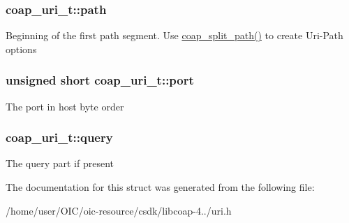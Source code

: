 \subsubsection[{path}]{ coap\+\_\+uri\+\_\+t\+::path}\label{structcoap__uri__t_ac6a10f366eb52282158abd163b2443b9}
Beginning of the first path segment. Use \hyperlink{group__uri__parse_gaf908e5dec2807e2591c9d4b7a2e1bdc9}{coap\+\_\+split\+\_\+path()} to create Uri-\/\+Path options \hypertarget{structcoap__uri__t_a032197612d4eea039f5bf690b074998c}{}
\subsubsection[{port}]{\setlength{\rightskip}{0pt plus 5cm}unsigned short coap\+\_\+uri\+\_\+t\+::port}\label{structcoap__uri__t_a032197612d4eea039f5bf690b074998c}
The port in host byte order \hypertarget{structcoap__uri__t_ac0650ecfdcd7e5f7ba8142fbffba6068}{}
\subsubsection[{query}]{ coap\+\_\+uri\+\_\+t\+::query}\label{structcoap__uri__t_ac0650ecfdcd7e5f7ba8142fbffba6068}
The query part if present 

The documentation for this struct was generated from the following file\+:\begin{DoxyCompactItemize}
\item 
/home/user/\+O\+I\+C/oic-\/resource/csdk/libcoap-\/4../uri.\+h\end{DoxyCompactItemize}
